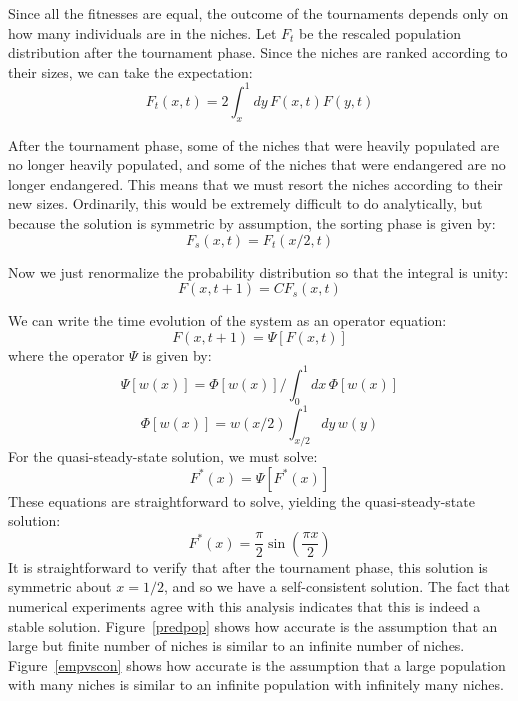 Since all the fitnesses are equal, the outcome of the tournaments depends
only on how many individuals are in the niches.  Let $F_t$ be the
rescaled population distribution after the tournament phase.  Since
the niches are ranked according to their sizes, we can take the expectation:
\begin{equation}
F_t(x,t)=2\int_x^1{dy\,F(x,t) F(y,t)}
\end{equation}

After the tournament phase, some of the niches that were heavily
populated are no longer heavily populated, and some of the niches that
were endangered are no longer endangered.  This means that we must resort
the niches according to their new sizes.  Ordinarily, this would be
extremely difficult to do analytically, but
because the solution is symmetric by assumption, the sorting phase is
given by:
\begin{equation}
F_{s}(x,t)=F_t(x/2,t)
\end{equation}

Now we just renormalize the probability distribution so that the integral
is unity:
\begin{equation}
F(x,t+1)=C F_s(x,t)
\end{equation}

We can write the time evolution of the system as an operator equation:
\begin{equation}
F(x,t+1)=\Psi[F(x,t)]
\end{equation}
where the operator $\Psi$ is given by:
\begin{equation}
\Psi[w(x)]=\Phi[w(x)]/\int_0^1{dx\, \Phi[w(x)]}
\end{equation}
\begin{equation}
\Phi[w(x)]=w(x/2)\int_{x/2}^1{dy\,w(y)}
\end{equation}
For the quasi-steady-state solution, we must solve:
\begin{equation}
F^*(x)=\Psi[F^*(x)]
\end{equation}
These equations are straightforward to solve, yielding the quasi-steady-state
solution:
\begin{equation}
F^*(x)=\frac{\pi}{2}\sin(\frac{\pi x}{2})
\end{equation}
It is straightforward to verify that after the tournament phase, this
solution is symmetric about $x=1/2$, and so we have a self-consistent
solution.  The fact that numerical experiments agree with this analysis
indicates that this is indeed a stable solution.  Figure~\ref{predpop}
shows how accurate is the assumption that an large but finite number
of niches is similar to an infinite number of niches.  Figure~\ref{empvscon}
shows how accurate is the assumption that a large population with many
niches is similar to an infinite population with infinitely many niches.

